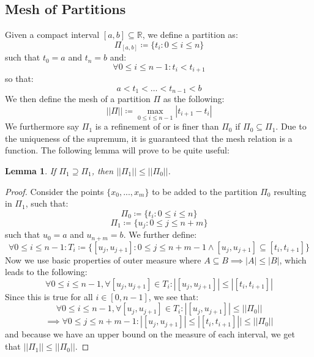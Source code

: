 \documentclass[10pt,letterpaper]{article} %
\newtheorem{lem}{Lemma}[section]
\begin{document}
\subsection{Mesh of Partitions}
Given a compact interval $[a, b] \subseteq \mathbb{R}$, we define a partition as:
\begin{equation*}
\Pi_{[a, b]} \coloneq \{t_i : 0 \leqslant i \leqslant n\}
\end{equation*}
such that $t_0 = a$ and $t_n = b$ and:
\begin{equation*}
\forall 0 \leqslant i \leqslant n-1: t_i < t_{i+1}
\end{equation*}
so that:
\begin{equation*}
a < t_1 < \dots < t_{n-1} < b
\end{equation*}
We then define the mesh of a partition $\Pi$ as the following:
\begin{equation*}
||\Pi|| \coloneq \max_{0 \leqslant i \leqslant n-1}|t_{i+1} - t_i|
\end{equation*}
We furthermore say $\Pi_1$ is a refinement of or is finer than $\Pi_0$ if $\Pi_0 \subseteq \Pi_1$. Due to the uniqueness of the supremum, it is guaranteed that the mesh relation is a function. The following lemma will prove to be quite useful:
\begin{lem}
If $\Pi_1 \supseteq \Pi_1$, then $||\Pi_1|| \leqslant ||\Pi_0||$.
\end{lem}
\begin{proof}
Consider the points $\{x_0, ..., x_m\}$ to be added to the partition $\Pi_0$ resulting in $\Pi_1$, such that:
\begin{equation*}
\Pi_0 \coloneq \{t_i: 0 \leqslant i \leqslant n\}
\end{equation*}
\begin{equation*}
\Pi_1 \coloneq \{u_j : 0 \leqslant j \leqslant n+m\}
\end{equation*}
such that $u_0 = a$ and $u_{n+m} = b$. We further define:
\begin{equation*}
\forall 0 \leqslant i \leqslant n-1: T_i \coloneq \{[u_j, u_{j+1}] : 0 \leqslant j \leqslant n+m - 1 \land [u_j, u_{j+1}] \subseteq [t_i, t_{i+1}]\}   
\end{equation*}
Now we use basic properties of outer measure where $A \subseteq B \implies |A| \leqslant |B|$, which leads to the following:
\begin{equation*}
\forall 0 \leqslant i \leqslant n-1, \forall [u_j, u_{j+1}] \in T_i: |[u_j, u_{j+1}]| \leqslant |[t_i, t_{i+1}]|
\end{equation*}
Since this is true for all $i \in [0, n-1]$, we see that:
\begin{equation*}
\forall 0 \leqslant i \leqslant n-1, \forall [u_j, u_{j+1}] \in T_i: |[u_j, u_{j+1}]| \leqslant ||\Pi_0||
\end{equation*}
\begin{equation*}
\implies \forall 0 \leqslant j \leqslant n+m-1: |[u_j, u_{j+1}]| \leqslant |[t_i, t_{i+1}]|| \leqslant ||\Pi_0||
\end{equation*}
and because we have an upper bound on the measure of each interval, we get that $||\Pi_1|| \leqslant ||\Pi_0||$. 
\end{proof}
\end{document}
